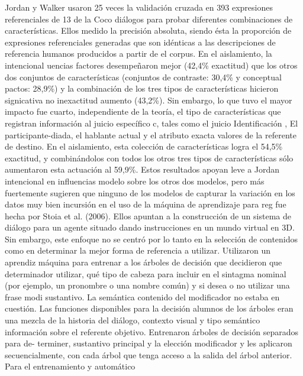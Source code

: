 Jordan y Walker usaron 25 veces la validaci\'on cruzada en 393 expresiones referenciales
de 13 de la Coco di\'alogos para probar diferentes combinaciones de caracter\'isticas. Ellos
medido la precisi\'on absoluta, siendo \'esta la proporci\'on de expresiones referenciales
generadas que son id\'enticas a las descripciones de referencia humanos producidos a partir de
el corpus. En el aislamiento, la intencional uencias factores desempe\~naron mejor (42,4\%
exactitud) que los otros dos conjuntos de caracter\'isticas (conjuntos de contraste: 30,4\% y conceptual
pactos: 28,9\%) y la combinaci\'on de los tres tipos de caracter\'isticas hicieron signicativa no inexactitud aumento (43,2\%). Sin embargo, lo que tuvo el mayor impacto fue cuarto,
independiente de la teor\'ia, el tipo de caracter\'isticas que registran informaci\'on al juicio espec\'ifico c, tales
como el juicio
Identificaci\'on
, El participante-diada, el hablante actual y el atributo exacta
valores de la referente de destino. En el aislamiento, esta colecci\'on de caracter\'isticas logra el 54,5\%
exactitud, y combin\'andolos con todos los otros tres tipos de caracter\'isticas s\'olo aumentaron
esta actuaci\'on al 59,9\%. Estos resultados apoyan leve a Jordan intencional
en
influencias modelo sobre los otros dos modelos, pero m\'as fuertemente sugieren que ninguno
de los modelos de capturar la variaci\'on en los datos muy bien
incursi\'on en el uso de la m\'aquina de aprendizaje para
reg
fue hecha por Stoia et al.
(2006). Ellos apuntan a la construcci\'on de un sistema de di\'alogo para un agente situado dando
instrucciones en un mundo virtual en 3D. Sin embargo, este enfoque no se centr\'o por lo
tanto en la selecci\'on de contenidos como en determinar la mejor forma de referencia a utilizar.
Utilizaron un aprendiz m\'aquina para entrenar a los \'arboles de decisi\'on que decidieron que determinador
utilizar, qu\'e tipo de cabeza para incluir en el sintagma nominal (por ejemplo, un pronombre o una
nombre com\'un) y si desea o no utilizar una frase modi sustantivo. La sem\'antica
contenido del modificador no estaba en cuesti\'on. Las funciones disponibles para la decisi\'on
alumnos de los \'arboles eran una mezcla de la historia del di\'alogo, contexto visual y tipo sem\'antico
informaci\'on sobre el referente objetivo. Entrenaron \'arboles de decisi\'on separados para de-
terminer, sustantivo principal y la elecci\'on modificador y les aplicaron secuencialmente, con cada \'arbol que tenga acceso a la salida del \'arbol anterior. Para el entrenamiento y autom\'atico
